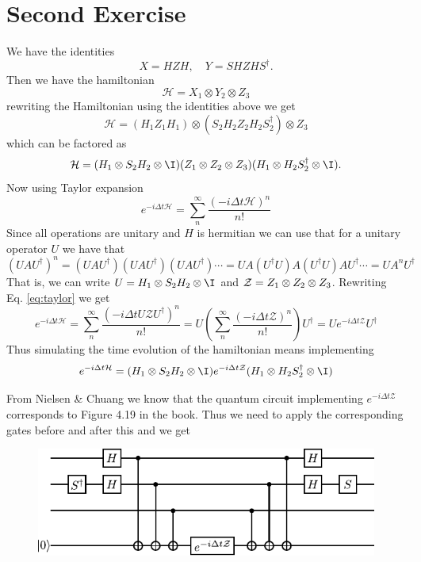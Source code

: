\section{Second Exercise}
We have the identities
\begin{equation}
    X = HZH, \quad Y = S H Z H S^\dagger.
\end{equation}
Then we have the hamiltonian 
\begin{equation}
    \mathcal{H} = X_1 \otimes Y_2 \otimes Z_3
\end{equation}
rewriting the Hamiltonian using the identities above we get
\begin{equation}
    \mathcal{H} = (H_1 Z_1 H_1) \otimes (S_2 H_2 Z_2 H_2 S^\dagger_2) \otimes Z_3
\end{equation}
which can be factored as
\begin{equation}
    \mathcal{H} =  (H_1 \otimes S_2 H_2 \otimes \I) ( Z_1 \ot Z_2 \ot Z_3) (H_1 \ot H_2 S^\dagger_2 \ot \I).
\end{equation}
Now using Taylor expansion
\begin{equation}
    e^{-i\Delta t \mathcal{H}} = \sum_{n}^{\infty}  \frac{(-i \Delta t \mathcal{H})^n}{n!}\label{eq:taylor}
\end{equation}
Since all operations are unitary and $H$ is hermitian we can use that for a unitary operator $U$ we have that 
\begin{equation}
    (U A U^\dagger)^n = (U A U^\dagger) (U A U^\dagger) (U A U^\dagger) \cdots = U A (U^\dagger U) A (U^\dagger U) A U^\dagger \cdots = U A^n U^\dagger
\end{equation}
That is, we can write $U = H_1 \otimes S_2 H_2 \otimes \I$ and $\mathcal{Z} = Z_1 \otimes Z_2 \otimes Z_3$. Rewriting Eq. \eqref{eq:taylor} we get
\begin{equation}
    e^{-i\Delta t \mathcal{H}} = \sum_{n}^{\infty}  \frac{(-i \Delta t U\mathcal{Z}U^\dagger)^n}{n!} = U \left( \sum_{n}^{\infty}  \frac{(-i \Delta t \mathcal{Z})^n}{n!} \right)U^\dagger = U e^{-i\Delta t \mathcal{Z}} U^\dagger
\end{equation}
Thus simulating the time evolution of the hamiltonian means implementing
\begin{equation}
    e^{-i\Delta t \mathcal{H}} = (H_1 \otimes S_2 H_2 \otimes \I)e^{-i\Delta t \mathcal{Z}} (H_1 \otimes H_2 S_2^\dagger \otimes \I)
\end{equation}


From Nielsen \& Chuang we know that the quantum circuit implementing $e^{-i\Delta t \mathcal{Z}}$ corresponds to Figure 4.19 in the book. Thus we need to apply the corresponding gates before and after this and we get
\begin{figure}[H]
    \centering
    \includegraphics[scale=1.3]{figures/circuit_2.pdf}
\end{figure}
